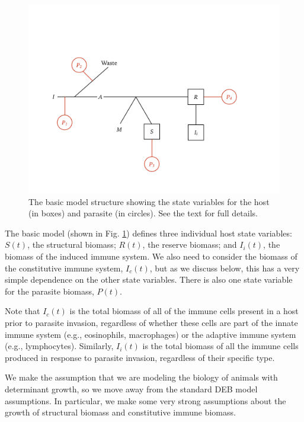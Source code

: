 \documentclass[11pt,reqno,final,pdftex]{amsart}\usepackage[]{graphicx}\usepackage[]{color}
\theoremstyle{plain}
\numberwithin{equation}{part}
\begin{document}
\begin{figure}
\includegraphics[width=\textwidth]{Macroparasite_DEB.png}
\caption{The basic model structure showing the state variables for the host (in boxes) and parasite (in circles). See the text for full details.}
\label{fig:model}
\end{figure}

The basic model (shown in Fig. \ref{fig:model}) defines three individual host state variables: $S(t)$, the structural biomass; $R(t)$, the reserve biomass; and $I_i(t)$, the biomass of the induced immune system.
We also need to consider the biomass of the constitutive immune system, $I_c(t)$, but as we discuss below, this has a very simple dependence on the other state variables.
There is also one state variable for the parasite biomass, $P(t)$.

Note that $I_c(t)$ is the total biomass of all of the immune cells present in a host prior to parasite invasion, regardless of whether these cells are part of the innate immune system (e.g., eosinophils, macrophages) or the adaptive immune system (e.g., lymphocytes).
Similarly, $I_i(t)$ is the total biomass of all the immune cells produced in response to parasite invasion, regardless of their specific type.

We make the assumption that we are modeling the biology of animals with determinant growth, so we move away from the standard DEB model assumptions.
In particular, we make some very strong assumptions about the growth of structural biomass and constitutive immune biomass.
\end{document}
